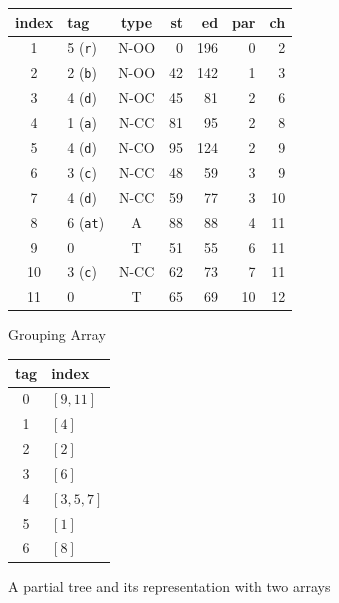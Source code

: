 \begin{figure}[t]
\begin{minipage}{.55\linewidth}
\begin{tabular}{c|lcrrrr}
			\hline
			index   & tag             & type &  st & ed  & par    &  ch \\
			\hline
			1  & 5 (\texttt{r})  & N-OO &  0  & 196 &   0    &  2  \\
			2  & 2 (\texttt{b})  & N-OO & 42  & 142 &   1    &  3  \\
			3  & 4 (\texttt{d})  & N-OC & 45  &  81 &   2    &  6  \\
			4  & 1 (\texttt{a})  & N-CC & 81  &  95 &   2    &  8  \\
			5  & 4 (\texttt{d})  & N-CO & 95  & 124 &   2    &  9  \\
			6  & 3 (\texttt{c})  & N-CC & 48  &  59 &   3    &  9  \\
			7  & 4 (\texttt{d})  & N-CC & 59  &  77 &   3    & 10  \\
			8  & 6 (\texttt{at}) & A    & 88  &  88 &   4    & 11  \\
			9  & 0               & T    & 51  &  55 &   6    & 11  \\
			10 & 3 (\texttt{c})  & N-CC & 62  &  73 &   7    & 11  \\
			11 & 0               & T    & 65  &  69 &  10    & 12  \\
			\hline
		\end{tabular}
	\end{minipage}
    \begin{minipage} {.2\linewidth}
    Grouping Array \\[15pt]
 	\begin{tabular}{c|l}
 	\hline
 	tag  &   index      \\
 	\hline
 	0  &  $[9, 11]$ \\
 	1  &  $[4]$ \\
 	2  &  $[2]$ \\
 	3  &  $[6]$  \\
 	4  &  $[3,5,7]$  \\
 	5  &  $[1]$  \\
 	6  &  $[8]$  \\
 	\hline
    \end{tabular}
\end{minipage}
	\caption{A partial tree and its representation with two arrays}
	\label{fig:2arrays}
\end{figure}

